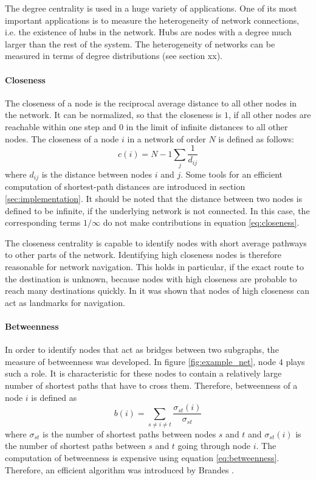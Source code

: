\documentclass[openright,twoside,headsepline]{scrbook}
\begin{document}
The degree centrality is used in a huge variety of applications.
One of its most important applications is to measure the heterogeneity of network connections, i.e. the existence of hubs in the network.
Hubs are nodes with a degree much larger than the rest of the system.
The heterogeneity of networks can be measured in terms of degree distributions (see section xx).


\paragraph{Closeness\color{Cayenne}{.}} 
The closeness of a node is the reciprocal average distance to all other nodes in the network.
It can be normalized, so that the closeness is $1$, if all other nodes are reachable within one step and $0$ in the limit of infinite distances to all other nodes.
The closeness of a node $i$ in a network of order $N$ is defined as follows:
\begin{equation}\label{eq:closeness}
c(i)=N-1 \sum _j \frac{1}{ d_{ij}}
\end{equation}
where $d_{ij}$ is the distance between nodes $i$ and $j$.
Some tools for an efficient computation of shortest-path distances are introduced in section \ref{sec:implementation}.
It should be noted that the distance between two nodes is defined to be infinite, if the underlying network is not connected.
In this case, the corresponding terms $1/\infty $ do not make contributions in equation \eqref{eq:closeness}.

The closeness centrality is capable to identify nodes with short average pathways to other parts of the network.
Identifying high closeness nodes is therefore reasonable for network navigation.
This holds in particular, if the exact route to the destination is unknown, because nodes with high closeness are probable to reach many destinations quickly.
In \citep{Zweig:closeness} it was shown that nodes of high closeness can act as landmarks for navigation.


\paragraph{Betweenness\color{Cayenne}{.}}
In order to identify nodes that act as bridges between two subgraphs, the measure of betweenness was developed.
In figure \ref{fig:example_net}, node $4$ plays such a role.
It is characteristic for these nodes to contain a relatively large number of shortest paths that have to cross them.
Therefore, betweenness of a node $i$ is defined as
\begin{equation}\label{eq:betweenness}
b(i)=\sum _{s\neq i \neq t} \frac{\sigma _{st}(i)}{\sigma _{st}}
\end{equation}
where $\sigma _{st}$ is the number of shortest paths between nodes $s$ and $t$ and $\sigma _{st} (i)$ is the number of shortest paths between $s$ and $t$ going through node $i$.
The computation of betweenness is expensive using equation \eqref{eq:betweenness}.
Therefore, an efficient algorithm was introduced by Brandes \citep{Brandes:2001p2757}.
\end{document}

